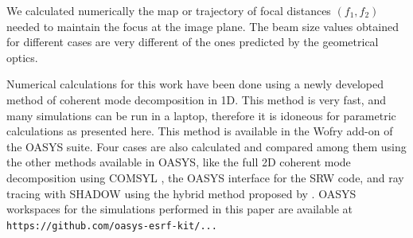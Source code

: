 \documentclass{iucr}              %
\begin{document}
We calculated numerically the map or trajectory of focal distances $(f_1,f_2)$ needed to maintain the focus at the image plane. The beam size values obtained for different cases are very different of the ones predicted by the geometrical optics.  

Numerical calculations for this work have been done using a newly developed method of coherent mode decomposition in 1D. This method is very fast, and many simulations can be run in a laptop, therefore it is idoneous for parametric calculations as presented here. This method is available in the Wofry add-on of the OASYS\cite{codeOASYS} suite. Four cases are also calculated and compared among them using the other methods available in OASYS, like the full 2D coherent mode decomposition using COMSYL \cite{codeCOMSYL}, the OASYS interface for the SRW \cite{codeSRW} code, and ray tracing with SHADOW\cite{codeSHADOW} using the hybrid method proposed by \cite{codeHYBRID}. OASYS workspaces for the simulations performed in this paper are available at {\tt https://github.com/oasys-esrf-kit/...} 





\appendix

\end{document}
